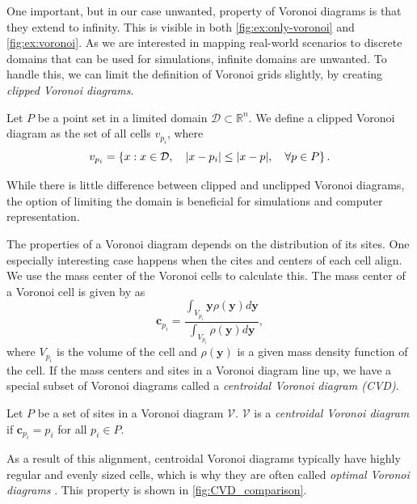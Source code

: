 One important, but in our case unwanted, property of Voronoi diagrams is that they extend to infinity. This is visible in both \autoref{fig:ex:only-voronoi} and \autoref{fig:ex:voronoi}. As we are interested in mapping real-world scenarios to discrete domains that can be used for simulations, infinite domains are unwanted. To handle this, we can limit the definition of Voronoi grids slightly, by creating \emph{clipped Voronoi diagrams}.

\begin{definition}
Let $P$ be a point set in a limited domain $\mathcal{D} \subset \mathbb{R}^n$. We define a clipped Voronoi diagram as the set of all cells $v_{p_i}$, where
\begin{equation}
\label{eq:clipped-voronoi}
    v_{p_i} = \left\{ x : x \in \mathcal{D},\quad \lvert x - p_i\rvert \leq \lvert x - p\rvert,\quad \forall p \in P \right\}.
\end{equation}
\end{definition}

While there is little difference between clipped and unclipped Voronoi diagrams, the option of limiting the domain is beneficial for simulations and computer representation.

The properties of a Voronoi diagram depends on the distribution of its sites. One especially interesting case happens when the cites and centers of each cell align. We use the mass center of the Voronoi cells to calculate this. The mass center of a Voronoi cell is given by \textcite{UPR_thesis} as
\begin{equation}
    \mathbf{c}_{p_i} = \frac
        {\int_{V_{p_i}} \mathbf{y} \rho(\mathbf{y}) d\mathbf{y}}
        {\int_{V_{p_i}} \rho(\mathbf{y}) d\mathbf{y}},
\end{equation}
where $V_{p_i}$ is the volume of the cell and $\rho(\mathbf{y})$ is a given mass density function of the cell. If the mass centers and sites in a Voronoi diagram line up, we have a special subset of Voronoi diagrams called a \emph{centroidal Voronoi diagram (CVD)}.

\begin{definition}
Let $P$ be a set of sites in a Voronoi diagram $\mathcal{V}$. $\mathcal{V}$ is a \emph{centroidal Voronoi diagram} if $\mathbf{c}_{p_i} = p_i$ for all $p_i \in P$.
\end{definition}

As a result of this alignment, centroidal Voronoi diagrams typically have highly regular and evenly sized cells, which is why they are often called \emph{optimal Voronoi diagrams} \cite{UPR_thesis}. This property is shown in \autoref{fig:CVD_comparison}.

